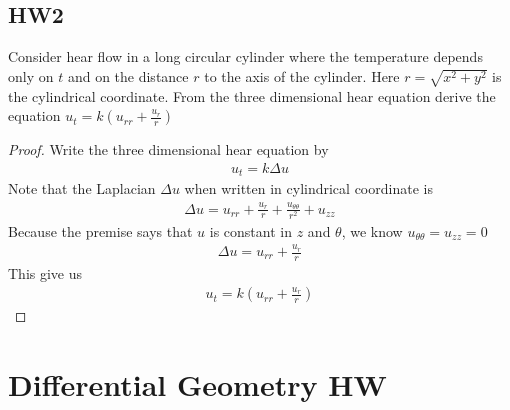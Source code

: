 \documentclass{report}
\begin{document}
\section{HW2}
\begin{question}{}{}
Consider hear flow in a long circular cylinder where the temperature depends only on $t$ and on the distance $r$ to the axis of the cylinder. Here $r=\sqrt{x^2+y^2}$ is the cylindrical coordinate. From the three dimensional hear equation derive the equation $u_t=k (u_{rr}+\frac{u_r}{r})$
\end{question}
\begin{proof}
Write the three dimensional hear equation by 
\begin{align*}
u_t= k \Delta u
\end{align*}
Note that the Laplacian $\Delta u$ when written in cylindrical coordinate is 
\begin{align*}
\Delta u= u_{rr} + \frac{u_r}{r} +\frac{u_{\theta \theta}}{r^2} + u_{zz}
\end{align*}
Because the premise says that $u$ is constant in $z$ and  $\theta$, we know $u_{\theta \theta}=u_{zz}=0$
\begin{align*}
\Delta u = u_{rr}+ \frac{u_r}{r}
\end{align*}
This give us 
\begin{align*}
u_t= k (u_{rr}+ \frac{u_r}{r})
\end{align*}
\end{proof}
\chapter{Differential Geometry HW} 
\end{document}
